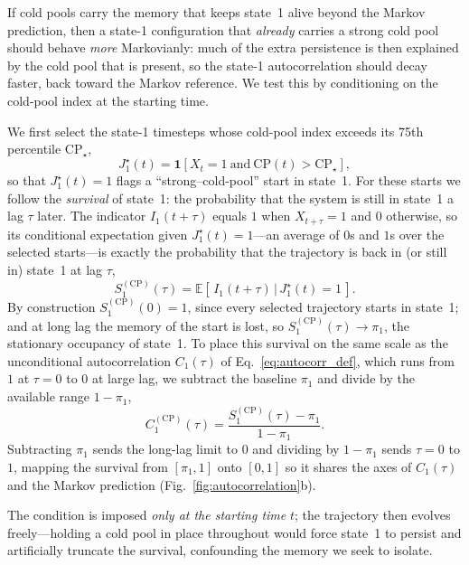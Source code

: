\documentclass[
    aps,
    prl,
    reprint,
    superscriptaddress,
    amsmath,amssymb,
    floatfix,
    nofootinbib
]{revtex4-2}
\begin{document}
If cold pools carry the memory that keeps state~1 alive beyond the Markov prediction, then a state-1 configuration that \emph{already} carries a strong cold pool should behave \emph{more} Markovianly: much of the extra persistence is then explained by the cold pool that is present, so the state-1 autocorrelation should decay faster, back toward the Markov reference. We test this by conditioning on the cold-pool index at the starting time.

We first select the state-1 timesteps whose cold-pool index exceeds its 75th percentile $\mathrm{CP}_\star$,
\begin{equation}
J_1^\star(t)=\mathbf{1}\!\left[X_t=1\ \text{and}\ \mathrm{CP}(t)>\mathrm{CP}_\star\right],
\end{equation}
so that $J_1^\star(t)=1$ flags a ``strong--cold-pool'' start in state~1. For these starts we follow the \emph{survival} of state~1: the probability that the system is still in state~1 a lag $\tau$ later. The indicator $I_1(t+\tau)$ equals $1$ when $X_{t+\tau}=1$ and $0$ otherwise, so its conditional expectation given $J_1^\star(t)=1$---an average of $0$s and $1$s over the selected starts---is exactly the probability that the trajectory is back in (or still in) state~1 at lag $\tau$,
\begin{equation}
S^{(\mathrm{CP})}_1(\tau)=\mathbb{E}\!\left[\,I_1(t+\tau)\,\big|\,J_1^\star(t)=1\,\right].
\end{equation}
By construction $S^{(\mathrm{CP})}_1(0)=1$, since every selected trajectory starts in state~1; and at long lag the memory of the start is lost, so $S^{(\mathrm{CP})}_1(\tau)\to\pi_1$, the stationary occupancy of state~1. To place this survival on the same scale as the unconditional autocorrelation $C_1(\tau)$ of Eq.~\eqref{eq:autocorr_def}, which runs from $1$ at $\tau=0$ to $0$ at large lag, we subtract the baseline $\pi_1$ and divide by the available range $1-\pi_1$,
\begin{equation}
C^{(\mathrm{CP})}_1(\tau)=\frac{S^{(\mathrm{CP})}_1(\tau)-\pi_1}{1-\pi_1}.
\end{equation}
Subtracting $\pi_1$ sends the long-lag limit to $0$ and dividing by $1-\pi_1$ sends $\tau=0$ to $1$, mapping the survival from $[\pi_1,1]$ onto $[0,1]$ so it shares the axes of $C_1(\tau)$ and the Markov prediction (Fig.~\ref{fig:autocorrelation}b).

The condition is imposed \emph{only at the starting time} $t$; the trajectory then evolves freely---holding a cold pool in place throughout would force state~1 to persist and artificially truncate the survival, confounding the memory we seek to isolate.
\end{document}
